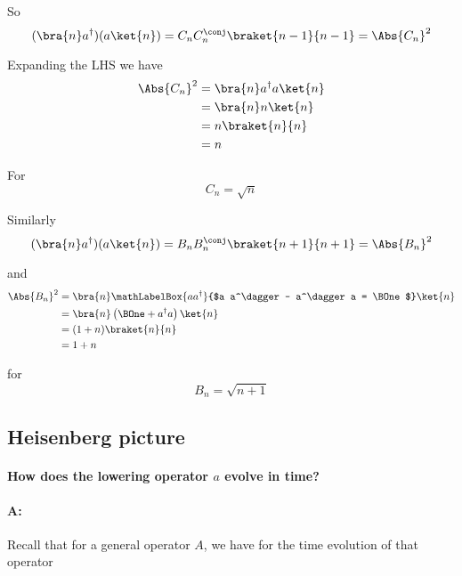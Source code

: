 So
\begin{equation}\label{eqn:PHY356FLecture11:230}
(\bra{n} a^\dagger) (a \ket{n}) = C_n C_n^\conj \braket{n-1}{n-1} = \Abs{C_n}^2
\end{equation}

Expanding the LHS we have
\begin{align*}
\Abs{C_n}^2 &=
\bra{n} a^\dagger a \ket{n} \\
&=
\bra{n} n \ket{n} \\
&=
n \braket{n}{n} \\
&=
n
\end{align*}

For
\begin{equation}\label{eqn:PHY356FLecture11:240}
C_n = \sqrt{n}
\end{equation}

Similarly
\begin{equation}\label{eqn:PHY356FLecture11:250}
(\bra{n} a^\dagger) (a \ket{n}) = B_n B_n^\conj \braket{n+1}{n+1} = \Abs{B_n}^2
\end{equation}

and
\begin{align*}
\Abs{B_n}^2 &=
\bra{n} 
\mathLabelBox{a a^\dagger}{$a a^\dagger - a^\dagger a = \BOne$}
\ket{n} \\
&=
\bra{n} \left( \BOne + a^\dagger a \right) \ket{n} \\
&=
(1 + n) \braket{n}{n} \\
&=
1 + n
\end{align*}

for
\begin{equation}\label{eqn:PHY356FLecture11:260}
B_n = \sqrt{n + 1}
\end{equation}

\subsection{Heisenberg picture}

\paragraph{How does the lowering operator $a$ evolve in time?}

\paragraph{A:} Recall that for a general operator $A$, we have for the time evolution of that operator

